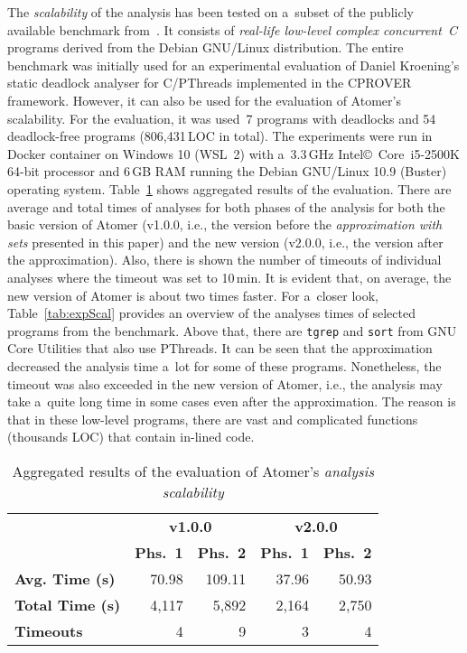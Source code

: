 \documentclass{ExcelAtFIT}
\theoremstyle{example}
\begin{document}
The \emph{scalability} of the analysis has been tested on a~subset of the publicly available benchmark from~\cite{deadlockKroening}. It consists of \emph{real-life low-level complex concurrent~C} programs derived from the Debian GNU/Linux distribution. The entire benchmark was initially used for an experimental evaluation of Daniel Kroening's static deadlock analyser for C/PThreads implemented in the CPROVER framework. However, it can also be used for the evaluation of Atomer's scalability. For the evaluation, it was used~7 programs with deadlocks and 54 deadlock-free programs (806,431\,LOC in total). The experiments were run in Docker container on Windows 10 (WSL~2) with a~3.3\,GHz Intel\copyright\ Core\texttrademark\ i5-2500K 64-bit processor and 6\,GB RAM running the Debian GNU/Linux 10.9 (Buster) operating system. Table~\ref{tab:expScalAgg} shows aggregated results of the evaluation. There are average and total times of analyses for both phases of the analysis for both the basic version of Atomer (v1.0.0, i.e., the version before the \emph{approximation with sets} presented in this paper) and the new version (v2.0.0, i.e., the version after the approximation). Also, there is shown the number of timeouts of individual analyses where the timeout was set to 10\,min. It is evident that, on average, the new version of Atomer is about two times faster. For a~closer look, Table~\ref{tab:expScal} provides an overview of the analyses times of selected programs from the benchmark. Above that, there are \texttt{tgrep} and \texttt{sort} from GNU Core Utilities that also use PThreads. It can be seen that the approximation decreased the analysis time a~lot for some of these programs. Nonetheless, the timeout was also exceeded in the new version of Atomer, i.e., the analysis may take a~quite long time in some cases even after the approximation. The reason is that in these low-level programs, there are vast and complicated functions (thousands LOC) that contain in-lined code.

\begin{table}[hbt]
    \centering

    \begin{tabular}{|l||r|r|r|r|}
        \hline
        \multirow{2}{*}{} & \multicolumn{2}{c|}{\textbf{v1.0.0}} & \multicolumn{2}{c|}{\textbf{v2.0.0}} \\ \cline{2-5}
        & \textbf{Phs.~1} & \textbf{Phs.~2} & \textbf{Phs.~1} & \textbf{Phs.~2} \\ \hline \hline
        \textbf{Avg. Time (s)} & 70.98 & 109.11 & 37.96 & 50.93 \\ \hline
        \textbf{Total Time (s)} & 4,117 & 5,892 & 2,164 & 2,750 \\ \hline
        \textbf{Timeouts} & 4 & 9 & 3 & 4 \\ \hline         
    \end{tabular}

    \caption{Aggregated results of the evaluation of Atomer's \emph{analysis scalability}}
    \label{tab:expScalAgg}
\end{table}
\end{document}

